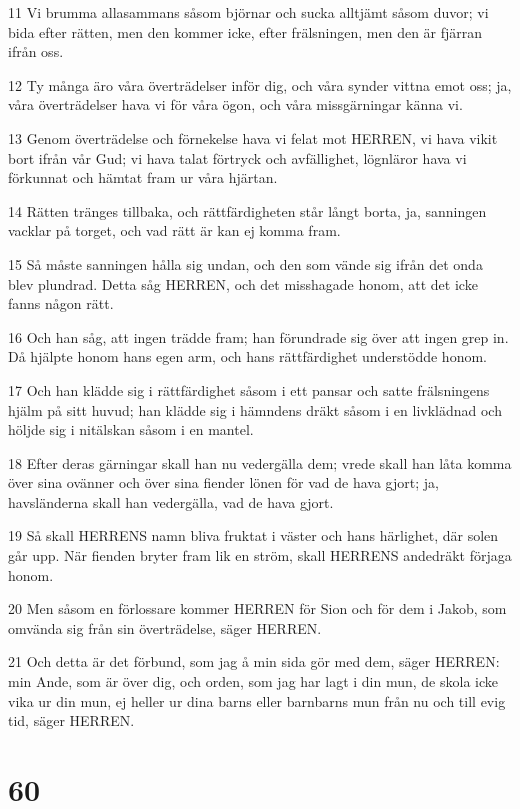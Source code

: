 \par 11 Vi brumma allasammans såsom björnar och sucka alltjämt såsom duvor; vi bida efter rätten, men den kommer icke, efter frälsningen, men den är fjärran ifrån oss.
\par 12 Ty många äro våra överträdelser inför dig, och våra synder vittna emot oss; ja, våra överträdelser hava vi för våra ögon, och våra missgärningar känna vi.
\par 13 Genom överträdelse och förnekelse hava vi felat mot HERREN, vi hava vikit bort ifrån vår Gud; vi hava talat förtryck och avfällighet, lögnläror hava vi förkunnat och hämtat fram ur våra hjärtan.
\par 14 Rätten tränges tillbaka, och rättfärdigheten står långt borta, ja, sanningen vacklar på torget, och vad rätt är kan ej komma fram.
\par 15 Så måste sanningen hålla sig undan, och den som vände sig ifrån det onda blev plundrad. Detta såg HERREN, och det misshagade honom, att det icke fanns någon rätt.
\par 16 Och han såg, att ingen trädde fram; han förundrade sig över att ingen grep in. Då hjälpte honom hans egen arm, och hans rättfärdighet understödde honom.
\par 17 Och han klädde sig i rättfärdighet såsom i ett pansar och satte frälsningens hjälm på sitt huvud; han klädde sig i hämndens dräkt såsom i en livklädnad och höljde sig i nitälskan såsom i en mantel.
\par 18 Efter deras gärningar skall han nu vedergälla dem; vrede skall han låta komma över sina ovänner och över sina fiender lönen för vad de hava gjort; ja, havsländerna skall han vedergälla, vad de hava gjort.
\par 19 Så skall HERRENS namn bliva fruktat i väster och hans härlighet, där solen går upp. När fienden bryter fram lik en ström, skall HERRENS andedräkt förjaga honom.
\par 20 Men såsom en förlossare kommer HERREN för Sion och för dem i Jakob, som omvända sig från sin överträdelse, säger HERREN.
\par 21 Och detta är det förbund, som jag å min sida gör med dem, säger HERREN: min Ande, som är över dig, och orden, som jag har lagt i din mun, de skola icke vika ur din mun, ej heller ur dina barns eller barnbarns mun från nu och till evig tid, säger HERREN.

\chapter{60}

